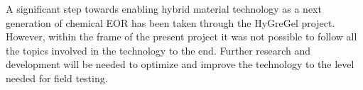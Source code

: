 \documentclass[nanomaterials,article,submit,moreauthors,pdftex]{Definitions/mdpi}
\begin{document}
A significant step towards enabling hybrid material technology as a next generation of chemical EOR has been taken through the HyGreGel project. However, within the frame of the present project it was not possible to follow all the topics involved in the technology to the end. Further research and development will be needed to optimize and improve the technology to the level needed for field testing. 








\vspace{6pt} 





\end{document}
